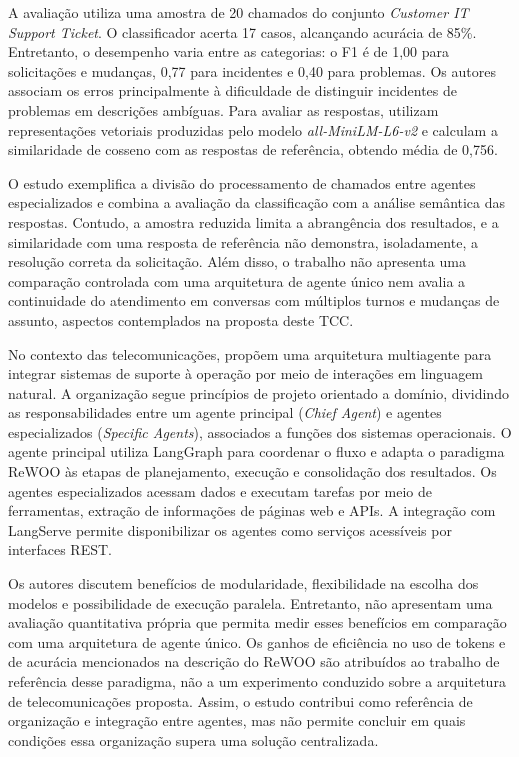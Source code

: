 A avaliação utiliza uma amostra de 20 chamados do conjunto \textit{Customer IT Support Ticket}. O classificador acerta 17 casos, alcançando acurácia de 85\%. Entretanto, o desempenho varia entre as categorias: o F1 é de 1,00 para solicitações e mudanças, 0,77 para incidentes e 0,40 para problemas. Os autores associam os erros principalmente à dificuldade de distinguir incidentes de problemas em descrições ambíguas. Para avaliar as respostas, utilizam representações vetoriais produzidas pelo modelo \textit{all-MiniLM-L6-v2} e calculam a similaridade de cosseno com as respostas de referência, obtendo média de 0,756.

O estudo exemplifica a divisão do processamento de chamados entre agentes especializados e combina a avaliação da classificação com a análise semântica das respostas. Contudo, a amostra reduzida limita a abrangência dos resultados, e a similaridade com uma resposta de referência não demonstra, isoladamente, a resolução correta da solicitação. Além disso, o trabalho não apresenta uma comparação controlada com uma arquitetura de agente único nem avalia a continuidade do atendimento em conversas com múltiplos turnos e mudanças de assunto, aspectos contemplados na proposta deste TCC.

No contexto das telecomunicações, \textcite{lee2025} propõem uma arquitetura multiagente para integrar sistemas de suporte à operação por meio de interações em linguagem natural. A organização segue princípios de projeto orientado a domínio, dividindo as responsabilidades entre um agente principal (\textit{Chief Agent}) e agentes especializados (\textit{Specific Agents}), associados a funções dos sistemas operacionais. O agente principal utiliza LangGraph para coordenar o fluxo e adapta o paradigma ReWOO às etapas de planejamento, execução e consolidação dos resultados. Os agentes especializados acessam dados e executam tarefas por meio de ferramentas, extração de informações de páginas web e APIs. A integração com LangServe permite disponibilizar os agentes como serviços acessíveis por interfaces REST.

Os autores discutem benefícios de modularidade, flexibilidade na escolha dos modelos e possibilidade de execução paralela. Entretanto, não apresentam uma avaliação quantitativa própria que permita medir esses benefícios em comparação com uma arquitetura de agente único. Os ganhos de eficiência no uso de tokens e de acurácia mencionados na descrição do ReWOO são atribuídos ao trabalho de referência desse paradigma, não a um experimento conduzido sobre a arquitetura de telecomunicações proposta. Assim, o estudo contribui como referência de organização e integração entre agentes, mas não permite concluir em quais condições essa organização supera uma solução centralizada. 

